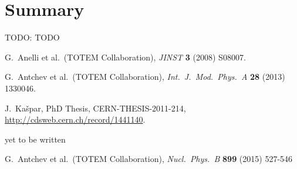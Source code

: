 \documentclass[TOTEM]{cern/cernphprep}
\def\etal{et al.}
\def\TODO#1{{\color{red}TODO: #1}}
\def\Name#1{#1, }
\def\Review#1#2#3#4{{\it #1} {\bf #2} (#3) #4}
\def\hang{\hangindent=\parindent}
\def\>{\par\vskip\itskip\parindent\itindent\indent\hang\llap{\hbox to3mm{$\bullet$\hss}}}
\def\>E{\par\vskip\itskip\parindent\itindent\indent\hang\llap{\hbox to3mm{\hss}}}
\def\>>{\par\vskip\iitskip\parindent\iitindent\indent\hang\llap{\hbox to\iitindent{\hss--\ }}}
\begin{document}

\section{Summary}
\label{s:sum}

\> \TODO{TODO}


\begin{thebibliography}{99}

	\Name{G.~Anelli \etal{}~(TOTEM Collaboration)}
	\Review{JINST}{3}{2008}{S08007}.

	\Name{G.~Antchev \etal{}~(TOTEM Collaboration)}
	\Review{Int.~J.~Mod.~Phys.~A}{28}{2013}{1330046}.

	\Name{J.~Ka\v spar}
	PhD Thesis, CERN-THESIS-2011-214,
	\url{http://cdsweb.cern.ch/record/1441140}.

	yet to be written

	\Name{G.~Antchev \etal{}~(TOTEM Collaboration)}
	\Review{Nucl.~Phys.~B}{899}{2015}{527-546}

\end{thebibliography}
\end{document}
